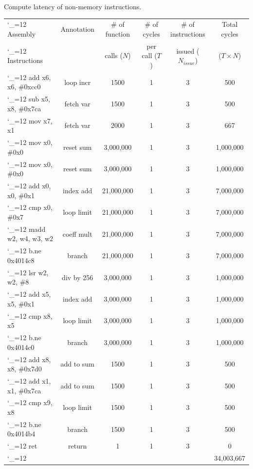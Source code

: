 \documentclass[
  course = {{ESE532 System-on-a-Chip}},
  quartile = {{}},
  assignment = 2,
  name = {{Sheil Sarda}},
  studentnumber = {{}},
  email = {{sheils@seas.upenn.edu}},
  firstexercise = 1
]{aga-homework}
\begin{document}
\subexercise Compute latency of non-memory instructions.
\begin{center}
	\begin{tabular}{|| >{\ttfamily\catcode`_=12 }l | c | c | c | c | c ||} 
		\hline
		Assembly   & Annotation  & $\#$ of function   & $\#$ of cycles & $\#$ of instructions & Total cycles  \\ [0.5ex] 
		Instructions&         & calls ($N$)    & per call ($T$) & issued ($N_{issue}$)    & ($T \times N$)\\ [0.5ex] 
		\hline\hline
		add     x6, x6, \#0xcc0      & loop incr   &    1500  &1    &3    & 500  \\ 
		sub     x5, x8, \#0x7ca      &  fetch var    &  1500    &1  &3    &  500  \\ 
		mov     x7, x1      & fetch var     &  2000   &1   &3    & 667  \\ 
		mov     x0, \#0x0      & reset sum     &   3,000,000   &1    &3    & 1,000,000  \\ 
		mov     x0, \#0x0       &   reset sum   &  3,000,000    &1   &3    & 1,000,000   \\ 
		add     x0, x0, \#0x1      & index add     & 21,000,000      &1    &3   & 7,000,000  \\ 
		cmp     x0, \#0x7      & loop limit     &  21,000,000    &1    &3    & 7,000,000  \\ 
		madd    w2, w4, w3, w2      &  coeff mult     &  21,000,000    &1   &3    & 7,000,000  \\ 
		b.ne    0x4014c8      &  branch    &  21,000,000     &1  &3    &7,000,000   \\ 
	    lsr     w2, w2, \#8     & div by 256      & 3,000,000    &1  &3    & 1,000,000  \\ 
		add     x5, x5, \#0x1      &  index add    &  3,000,000   &1  &3    & 1,000,000  \\ 
		cmp     x8, x5      & loop limit      &  3,000,000   &1    &3  &  1,000,000 \\ 
		b.ne    0x4014c0      &  branch    &  3,000,000   &1   &3   & 1,000,000  \\ 
		add     x8, x8, \#0x7d0     &  add to sum    &  1500     &1  &3    &  500 \\ 
		add     x1, x1, \#0x7ca     &  add to sum     & 1500     &1    &3    &  500 \\ 
		cmp     x9, x8     & loop limit      & 1500     &1  &3   &500   \\ 
		b.ne    0x4014b4      &   branch   &  1500   &1   &3   & 500  \\ 
		ret     &  return    & 1     &1   &3   &0   \\    
		\hline\hline       
		&     &     &   &   & 34,003,667   \\                       
		\hline
	\end{tabular}
\end{center}
\end{document}
